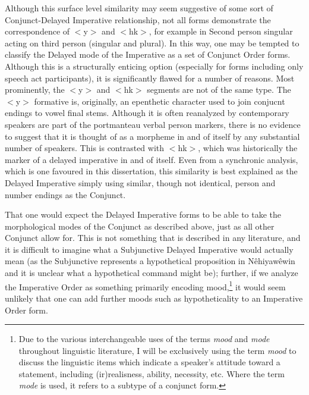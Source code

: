 Although this surface level similarity may seem suggestive of some sort of Conjunct-Delayed Imperative relationship, not all forms demonstrate the correspondence of $<$y$>$ and $<$hk$>$, for example in Second person singular acting on third person (singular and plural). In this way, one may be tempted to classify the Delayed mode of the Imperative as a set of Conjunct Order forms. Although this is a structurally enticing option (especially for forms including only speech act participants), it is significantly flawed for a number of reasons. Most prominently, the $<$y$>$ and $<$hk$>$ segments are not of the same type. The $<$y$>$ formative is, originally, an epenthetic character used to join conjucnt endings to vowel final stems. Although it is often reanalyzed by contemporary speakers are part of the portmanteau verbal person markers, there is no evidence to suggest that it is thought of as a morpheme in and of itself by any substantial number of speakers. This is contrasted with $<$hk$>$, which was historically the marker of a delayed imperative in and of itself. Even from a synchronic analysis, which is one favoured in this dissertation, this similarity is best explained as the Delayed Imperative simply using similar, though not identical, person and number endings as the Conjunct. 

That  one would expect the Delayed Imperative forms to be able to take the morphological modes of the Conjunct as described above, just as all other Conjunct allow for. This is not something that is described in any literature, and it is difficult to imagine what a Subjunctive Delayed Imperative would actually mean (as the Subjunctive represents a hypothetical proposition in Nêhiyawêwin and it is unclear what a hypothetical command might be); further, if we analyze the Imperative Order as something primarily encoding mood,\footnote{Due to the various interchangeable uses of the terms \textit{mood} and \textit{mode} throughout linguistic literature, I will be exclusively using the term \textit{mood} to discuss the linguistic items which indicate a speaker's attitude toward a statement, including (ir)realisness, ability, necessity, etc. Where the term \textit{mode} is used, it refers to a subtype of a conjunct form.} it would seem unlikely that one can add further moods such as hypotheticality to an Imperative Order form. 


